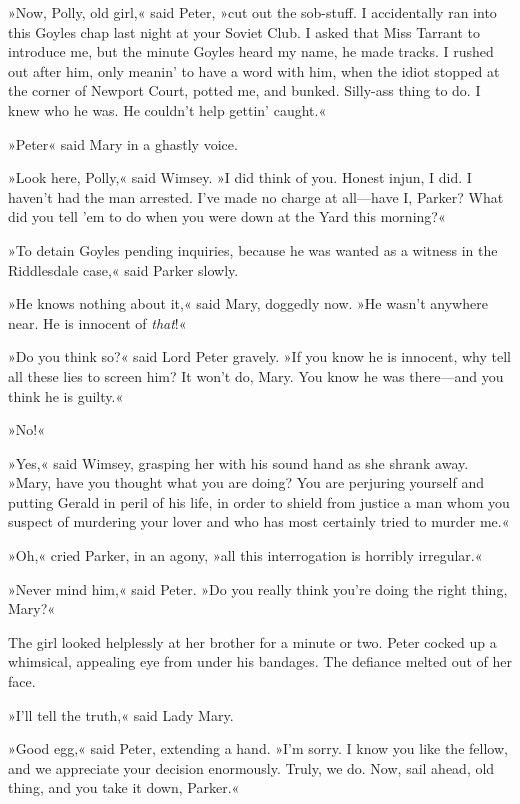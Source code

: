 »Now, Polly, old girl,« said Peter, »cut out the sob-stuff. I accidentally ran into this Goyles chap last night at your Soviet Club.  I asked that Miss Tarrant to introduce me, but the minute Goyles heard my name, he made tracks. I rushed out after him, only meanin' to have a word with him, when the idiot stopped at the corner of Newport Court, potted me, and bunked. Silly-ass thing to do. I knew who he was. He couldn't help gettin' caught.«

»Peter\longdash« said Mary in a ghastly voice.

»Look here, Polly,« said Wimsey. »I did think of you. Honest injun, I did. I haven't had the man arrested. I've made no charge at all\allowbreak---\allowbreak have I, Parker? What did you tell 'em to do when you were down at the Yard this morning?«

»To detain Goyles pending inquiries, because he was wanted as a witness in the Riddlesdale case,« said Parker slowly.

»He knows nothing about it,« said Mary, doggedly now. »He wasn't anywhere near. He is innocent of \textit{that}!«

»Do you think so?« said Lord Peter gravely. »If you know he is innocent, why tell all these lies to screen him? It won't do, Mary. You know he was there\allowbreak---\allowbreak and you think he is guilty.«

»No!«

»Yes,« said Wimsey, grasping her with his sound hand as she shrank away. »Mary, have you thought what you are doing? You are perjuring yourself and putting Gerald in peril of his life, in order to shield from justice a man whom you suspect of murdering your lover and who has most certainly tried to murder me.«

»Oh,« cried Parker, in an agony, »all this interrogation is horribly irregular.«

»Never mind him,« said Peter. »Do you really think you're doing the right thing, Mary?«

The girl looked helplessly at her brother for a minute or two. Peter cocked up a whimsical, appealing eye from under his bandages. The defiance melted out of her face.

»I'll tell the truth,« said Lady Mary.

»Good egg,« said Peter, extending a hand. »I'm sorry. I know you like the fellow, and we appreciate your decision enormously. Truly, we do.  Now, sail ahead, old thing, and you take it down, Parker.«

